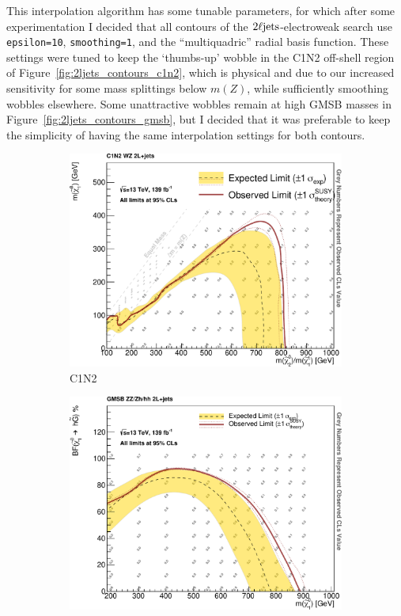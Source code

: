 This interpolation algorithm has some tunable parameters, for which after some
experimentation I decided that all contours of the $2\ell\mathrm{jets}$-electroweak
search use
\texttt{epsilon=10},
\texttt{smoothing=1},
and the ``multiquadric'' radial basis function.
These settings were tuned to keep the `thumbs-up' wobble in the C1N2 off-shell
region of Figure~\ref{fig:2ljets_contours_c1n2},
which is physical and due to our increased sensitivity for some mass splittings
below $m(Z)$,
while sufficiently smoothing wobbles elsewhere.
Some unattractive wobbles remain at high GMSB masses in
Figure~\ref{fig:2ljets_contours_gmsb}, but I decided that it was preferable to
keep the simplicity of having the same interpolation settings for both
contours.

\begin{figure}[tp]
\centering
\begin{subfigure}{0.48\textwidth}
\centering
\includegraphics[width=\textwidth]{figures/2ljets_c1n2_Output_Contours_cls_obs.pdf}
\caption{C1N2}
\end{subfigure}
\hfill
\begin{subfigure}{0.48\textwidth}
\centering
\includegraphics[width=\textwidth]{figures/2ljets_gmsb_Output_Contours_cls_obs.pdf}

\end{subfigure}
\end{figure}
